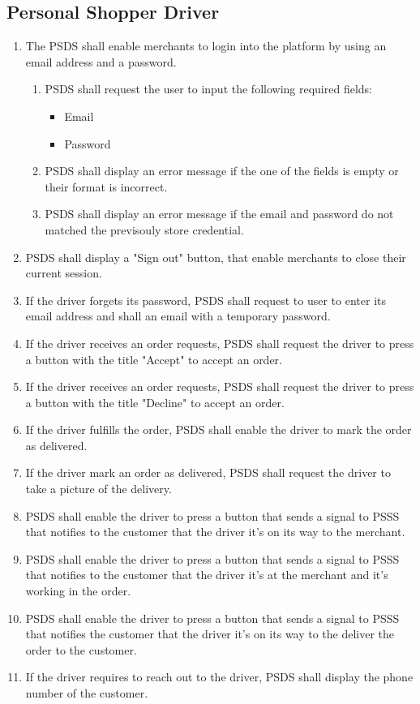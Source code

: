 \pagebreak

\subsection{Personal Shopper Driver}
\begin{enumerate}[resume, label=SY-\arabic*]
    \item  The PSDS shall enable merchants to login into the platform by 
    using an email address and a password.
    \begin{enumerate}[label=SY-28.\arabic*]
        \item PSDS shall request the user to input the following required 
        fields:
        \begin{itemize}
            \item Email
            \item Password
        \end{itemize}
        \item PSDS shall display an error message if the one of the fields is 
        empty or their format is incorrect.
        \item PSDS shall display an error message if the email and password 
        do not matched the previsouly store credential.
    \end{enumerate}
    \item PSDS shall display a "Sign out" button, that enable merchants to 
    close their current session.
    \item  If the driver forgets its password, PSDS shall request to user to 
    enter its email address and shall an email with a temporary password.
    \item  If the driver receives an order requests, PSDS shall request the 
    driver to press a button with the title "Accept" to accept an order.
    \item  If the driver receives an order requests, PSDS shall request the 
    driver to press a button with the title "Decline" to accept an order.
    \item  If the driver fulfills the order, PSDS shall enable the driver to 
    mark the order as delivered.
	\item  If the driver mark an order as delivered, PSDS shall request the 
    driver to take a picture of the delivery.
    \item  PSDS shall enable the driver to press a button that sends a signal 
    to PSSS that notifies to the customer that the driver it's on its 
    way to the merchant.
    \item  PSDS shall enable the driver to press a button that sends a signal 
    to PSSS that notifies to the customer that the driver it's at the 
    merchant and it's working in the order.
    \item  PSDS shall enable the driver to press a button that sends a signal 
    to PSSS that notifies the customer that the driver it's on its way to the 
    deliver the order to the customer.
    \item  If the driver requires to reach out to the driver, PSDS shall 
    display the phone number of the customer.
\end{enumerate}
